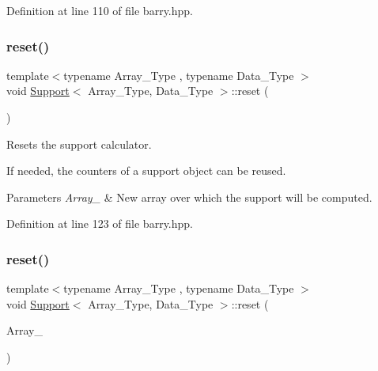 Definition at line 110 of file barry.\+hpp.

\mbox{\label{classbarry_1_1_support_a5878ac60282fc1380c92f3ba502f249e}} 
\subsubsection{\texorpdfstring{reset()}{reset()}\hspace{0.1cm}{\footnotesize\ttfamily [1/2]}}
{\footnotesize\ttfamily template$<$typename Array\+\_\+\+Type , typename Data\+\_\+\+Type $>$ \\
void \hyperlink{classbarry_1_1_support}{Support}$<$ Array\+\_\+\+Type, Data\+\_\+\+Type $>$\+::reset (\begin{DoxyParamCaption}{ }\end{DoxyParamCaption})\hspace{0.3cm}{\ttfamily [inline]}}



Resets the support calculator. 

If needed, the counters of a support object can be reused.


\begin{DoxyParams}{Parameters}
{\em Array\+\_\+} & New array over which the support will be computed. \\
\hline
\end{DoxyParams}


Definition at line 123 of file barry.\+hpp.

\mbox{\label{classbarry_1_1_support_afbe207cc2762bc698c9ccb3212e9de78}} 
\subsubsection{\texorpdfstring{reset()}{reset()}\hspace{0.1cm}{\footnotesize\ttfamily [2/2]}}
{\footnotesize\ttfamily template$<$typename Array\+\_\+\+Type , typename Data\+\_\+\+Type $>$ \\
void \hyperlink{classbarry_1_1_support}{Support}$<$ Array\+\_\+\+Type, Data\+\_\+\+Type $>$\+::reset (\begin{DoxyParamCaption}\item[{const Array\+\_\+\+Type $\ast$}]{Array\+\_\+ }\end{DoxyParamCaption})\hspace{0.3cm}{\ttfamily [inline]}}



